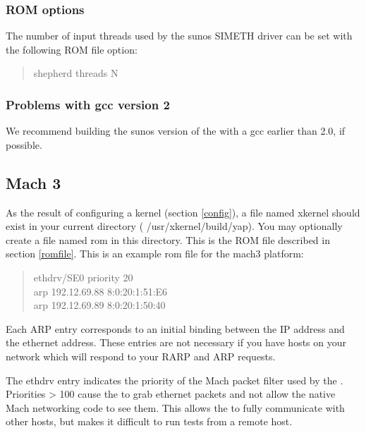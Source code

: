 \subsubsection{ROM options}

The number of input threads used by the sunos SIMETH driver can be set
with the following ROM file option:

\begin{quote}
\begin{tt}
shepherd threads N
\end{tt}
\end{quote}

\subsubsection{ Problems with gcc version 2}

We recommend building the sunos version of the \xk{} with a gcc
earlier than 2.0, if possible.

\subsection{Mach 3}

As the result of configuring a kernel (section \ref{config}), a file
named {\sanss xkernel} should exist in your current directory ({\sanss
/usr/xkernel/build/yap}).  You may optionally create a file named
{\sanss rom} in this directory.  This is the ROM file described in
section \ref{romfile}.
This is an example {\sanss rom} file for the mach3 platform:

\begin{quote}
\begin{tt}
ethdrv/SE0 priority 20\\ arp		192.12.69.88 8:0:20:1:51:E6\\
arp		192.12.69.89 8:0:20:1:50:40\\
\end{tt}
\end{quote}

Each ARP entry corresponds to an initial binding between the IP
address and the ethernet address.  These entries are not necessary if
you have hosts on your network which will respond to your RARP and ARP
requests.

The ethdrv entry indicates the priority of the Mach packet filter used
by the \xk{}.  Priorities > 100 cause the \xk{} to grab
ethernet packets and not allow the native Mach networking code to see
them.  This allows the \xk{} to fully communicate with other hosts,
but makes it difficult to run
\xk{} tests from a remote host.  

